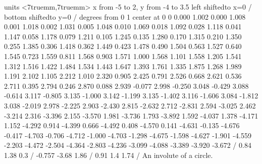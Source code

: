 \figure
\texonly
\vbox{\beginpicture
\normalgraphs
\sevenpoint
\setcoordinatesystem units <7truemm,7truemm>
\setplotarea x from -5 to 2, y from -4  to 3.5
\axis left shiftedto x=0 /
\axis bottom shiftedto y=0 /
 degrees from 0 1 center at 0 0
\setquadratic
\textRed
{} 0.000 1.002 0.000 1.008 0.001 1.018 0.002 1.031 0.005
1.048 0.010 1.069 0.018 1.092 0.028 1.118 0.041 1.147 0.058
1.178 0.079 1.211 0.105 1.245 0.135 1.280 0.170 1.315 0.210
1.350 0.255 1.385 0.306 1.418 0.362 1.449 0.423 1.478 0.490
1.504 0.563 1.527 0.640 1.545 0.723 1.559 0.811 1.568 0.903
1.571 1.000 1.568 1.101 1.558 1.205 1.541 1.312 1.516 1.422
1.484 1.534 1.443 1.647 1.393 1.761 1.335 1.875 1.268 1.989
1.191 2.102 1.105 2.212 1.010 2.320 0.905 2.425 0.791 2.526
0.668 2.621 0.536 2.711 0.395 2.794 0.246 2.870 0.088 2.939
-0.077 2.998 -0.250 3.048 -0.429 3.088 -0.614 3.117 -0.805 3.135
-1.000 3.142 -1.199 3.135 -1.402 3.116 -1.606 3.084 -1.812 3.038
-2.019 2.978 -2.225 2.903 -2.430 2.815 -2.632 2.712 -2.831 2.594
-3.025 2.462 -3.214 2.316 -3.396 2.155 -3.570 1.981 -3.736 1.793
-3.892 1.592 -4.037 1.378 -4.171 1.152 -4.292 0.914 -4.399 0.666
-4.492 0.408 -4.570 0.141 -4.631 -0.135 -4.676 -0.417 -4.703 -0.706
-4.712 -1.000 -4.703 -1.298 -4.675 -1.598 -4.627 -1.901 -4.559 -2.203
-4.472 -2.504 -4.364 -2.803 -4.236 -3.099 -4.088 -3.389 -3.920 -3.672 /
\textBlack
\setlinear\setdashes <2pt>
 0.84 1.38 0.3 /
 -0.757 -3.68 1.86 /
 0.91 1.4 1.74 /
\endpicture}
\endtexonly
{}
\begincaption
An involute of a circle.
\endcaption
\endfigure
\endexercise

\endexercises
